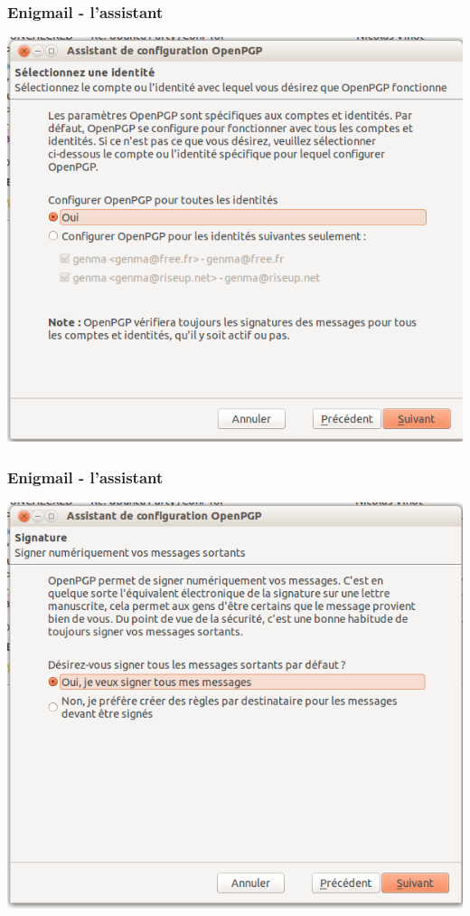 \documentclass{beamer}
\begin{document}
\begin{frame}
\frametitle{Enigmail - l'assistant}
\begin{center}
\includegraphics[scale=0.3] {./images/Assistant02.png}
\end{center}
\end{frame}

\begin{frame}
\frametitle{Enigmail - l'assistant}
\begin{center}
\includegraphics[scale=0.3] {./images/Assistant03.png}
\end{center}
\end{frame}
\end{document}

